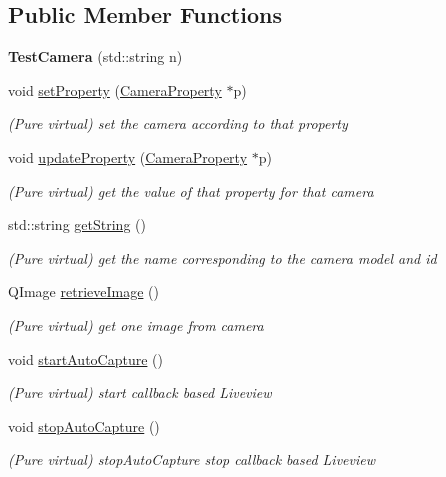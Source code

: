 \subsection*{Public Member Functions}
\begin{DoxyCompactItemize}
\item 
\hypertarget{class_test_camera_a46fb8a67d24675886760e6fc0058edb3}{{\bfseries Test\-Camera} (std\-::string n)}\label{class_test_camera_a46fb8a67d24675886760e6fc0058edb3}

\item 
void \hyperlink{class_test_camera_a92507f0e4601f93912b06297e4b59d99}{set\-Property} (\hyperlink{class_camera_manager_1_1_camera_property}{Camera\-Property} $\ast$p)
\begin{DoxyCompactList}\small\item\em (Pure virtual) set the camera according to that property \end{DoxyCompactList}\item 
void \hyperlink{class_test_camera_a6b0c9e25baafe0a8d211b32851cb67b3}{update\-Property} (\hyperlink{class_camera_manager_1_1_camera_property}{Camera\-Property} $\ast$p)
\begin{DoxyCompactList}\small\item\em (Pure virtual) get the value of that property for that camera \end{DoxyCompactList}\item 
std\-::string \hyperlink{class_test_camera_a5ddb007a4c0c44e06b24787298f1c97c}{get\-String} ()
\begin{DoxyCompactList}\small\item\em (Pure virtual) get the name corresponding to the camera model and id \end{DoxyCompactList}\item 
Q\-Image \hyperlink{class_test_camera_a283bd75f1b9500e35ba7aa252c2df14e}{retrieve\-Image} ()
\begin{DoxyCompactList}\small\item\em (Pure virtual) get one image from camera \end{DoxyCompactList}\item 
\hypertarget{class_test_camera_a095498b65800c150009292e73f765621}{void \hyperlink{class_test_camera_a095498b65800c150009292e73f765621}{start\-Auto\-Capture} ()}\label{class_test_camera_a095498b65800c150009292e73f765621}

\begin{DoxyCompactList}\small\item\em (Pure virtual) start callback based Liveview \end{DoxyCompactList}\item 
\hypertarget{class_test_camera_a52f8f0ee49d83d927878cc2dd64a0af1}{void \hyperlink{class_test_camera_a52f8f0ee49d83d927878cc2dd64a0af1}{stop\-Auto\-Capture} ()}\label{class_test_camera_a52f8f0ee49d83d927878cc2dd64a0af1}

\begin{DoxyCompactList}\small\item\em (Pure virtual) stop\-Auto\-Capture stop callback based Liveview \end{DoxyCompactList}\end{DoxyCompactItemize}
